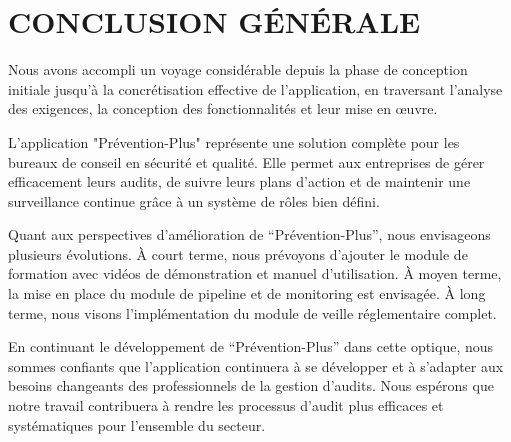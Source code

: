 \chapter*{CONCLUSION GÉNÉRALE}
\adjustmtc
\thispagestyle{MyStyle}

\noindent Nous avons accompli un voyage considérable depuis la phase de conception initiale jusqu'à la concrétisation effective de l'application, en traversant l'analyse des exigences, la conception des fonctionnalités et leur mise en œuvre.\par

L'application "Prévention-Plus" représente une solution complète pour les bureaux de conseil en sécurité et qualité. Elle permet aux entreprises de gérer efficacement leurs audits, de suivre leurs plans d'action et de maintenir une surveillance continue grâce à un système de rôles bien défini.\par

Quant aux perspectives d'amélioration de ``Prévention-Plus'', nous envisageons plusieurs évolutions. À court terme, nous prévoyons d'ajouter le module de formation avec vidéos de démonstration et manuel d'utilisation. À moyen terme, la mise en place du module de pipeline et de monitoring est envisagée. À long terme, nous visons l'implémentation du module de veille réglementaire complet.\par
En continuant le développement de ``Prévention-Plus'' dans cette optique, nous sommes confiants que l'application continuera à se développer et à s'adapter aux besoins changeants des professionnels de la gestion d'audits. Nous espérons que notre travail contribuera à rendre les processus d'audit plus efficaces et systématiques pour l'ensemble du secteur.

